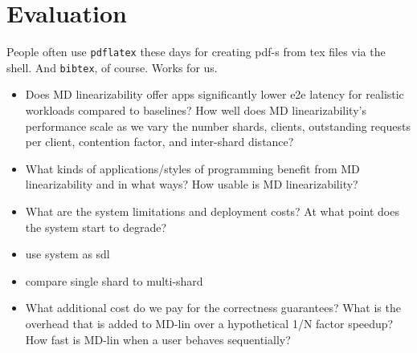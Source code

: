 \section{Evaluation}
\label{sec:eval}
People often use \texttt{pdflatex} these days for creating pdf-s from
tex files via the shell. And \texttt{bibtex}, of course. Works for us.
\begin{figure}
\label{fig:placeholder}
\end{figure}
\begin{itemize}
\item Does MD linearizability offer apps significantly lower e2e latency for realistic workloads compared to baselines?
  \subitem How well does MD linearizability’s performance scale as we vary the number shards, clients, outstanding requests per client, contention factor, and inter-shard distance?
\item What kinds of applications/styles of programming benefit from MD linearizability and in what ways? How usable is MD linearizability?
\item What are the system limitations and deployment costs? At what point does the system start to degrade?
    \item use system as sdl
    \item compare single shard to multi-shard
\item What additional cost do we pay for the correctness guarantees? What is the overhead that is added to MD-lin over a hypothetical 1/N factor speedup? How fast is MD-lin when a user behaves sequentially?

\end{itemize}

